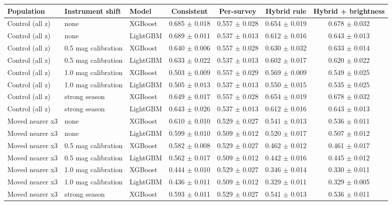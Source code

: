 \begin{tabular}{lllcccc}
\hline
Population & Instrument shift & Model & Consistent & Per-survey & Hybrid rule & Hybrid + brightness \\
\hline
Control (all z) & none & XGBoost & 0.685 $\pm$ 0.018 & 0.557 $\pm$ 0.028 & 0.654 $\pm$ 0.019 & 0.678 $\pm$ 0.032 \\
Control (all z) & none & LightGBM & 0.689 $\pm$ 0.011 & 0.537 $\pm$ 0.013 & 0.612 $\pm$ 0.016 & 0.643 $\pm$ 0.013 \\
Control (all z) & 0.5 mag calibration & XGBoost & 0.640 $\pm$ 0.006 & 0.557 $\pm$ 0.028 & 0.630 $\pm$ 0.032 & 0.633 $\pm$ 0.014 \\
Control (all z) & 0.5 mag calibration & LightGBM & 0.633 $\pm$ 0.022 & 0.537 $\pm$ 0.013 & 0.602 $\pm$ 0.017 & 0.620 $\pm$ 0.022 \\
Control (all z) & 1.0 mag calibration & XGBoost & 0.503 $\pm$ 0.009 & 0.557 $\pm$ 0.029 & 0.569 $\pm$ 0.009 & 0.549 $\pm$ 0.025 \\
Control (all z) & 1.0 mag calibration & LightGBM & 0.505 $\pm$ 0.013 & 0.537 $\pm$ 0.013 & 0.550 $\pm$ 0.015 & 0.535 $\pm$ 0.025 \\
Control (all z) & strong season & XGBoost & 0.649 $\pm$ 0.017 & 0.557 $\pm$ 0.028 & 0.654 $\pm$ 0.019 & 0.678 $\pm$ 0.032 \\
Control (all z) & strong season & LightGBM & 0.643 $\pm$ 0.026 & 0.537 $\pm$ 0.013 & 0.612 $\pm$ 0.016 & 0.643 $\pm$ 0.013 \\
Moved nearer x3 & none & XGBoost & 0.610 $\pm$ 0.010 & 0.529 $\pm$ 0.027 & 0.541 $\pm$ 0.013 & 0.536 $\pm$ 0.011 \\
Moved nearer x3 & none & LightGBM & 0.599 $\pm$ 0.010 & 0.509 $\pm$ 0.012 & 0.520 $\pm$ 0.017 & 0.507 $\pm$ 0.012 \\
Moved nearer x3 & 0.5 mag calibration & XGBoost & 0.582 $\pm$ 0.008 & 0.529 $\pm$ 0.027 & 0.462 $\pm$ 0.012 & 0.461 $\pm$ 0.017 \\
Moved nearer x3 & 0.5 mag calibration & LightGBM & 0.562 $\pm$ 0.017 & 0.509 $\pm$ 0.012 & 0.442 $\pm$ 0.016 & 0.445 $\pm$ 0.012 \\
Moved nearer x3 & 1.0 mag calibration & XGBoost & 0.444 $\pm$ 0.010 & 0.529 $\pm$ 0.027 & 0.346 $\pm$ 0.014 & 0.330 $\pm$ 0.011 \\
Moved nearer x3 & 1.0 mag calibration & LightGBM & 0.436 $\pm$ 0.011 & 0.509 $\pm$ 0.012 & 0.329 $\pm$ 0.011 & 0.329 $\pm$ 0.005 \\
Moved nearer x3 & strong season & XGBoost & 0.593 $\pm$ 0.011 & 0.529 $\pm$ 0.027 & 0.541 $\pm$ 0.013 & 0.536 $\pm$ 0.011 \\

\end{tabular}
